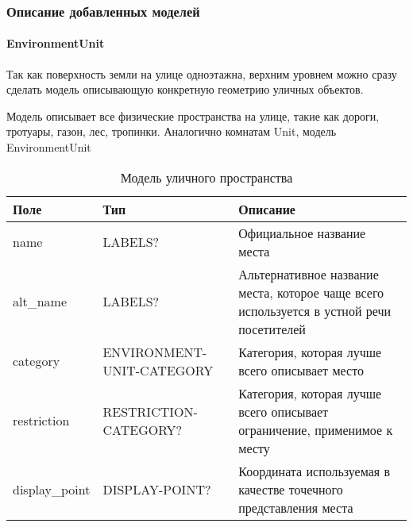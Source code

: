     \subsubsection{Описание добавленных моделей}
      \paragraph{EnvironmentUnit}
        Так как поверхность земли на улице одноэтажна, верхним уровнем можно сразу сделать модель описывающую конкретную геометрию уличных объектов.

        Модель описывает все физические пространства на улице, такие как дороги, тротуары, газон, лес, тропинки. Аналогично комнатам Unit, модель EnvironmentUnit
        \begin{center}
          \begin{xltabular}{\linewidth}{|l|p{4cm}|X|}
            \caption{Модель уличного пространства}\\\hline
            Поле           & Тип                       & Описание                                                                                 \\ \hline
            name           & LABELS?                   & Официальное название места                                                               \\ \hline
            alt\_name      & LABELS?                   & Альтернативное название места, которое чаще всего используется в устной речи посетителей \\ \hline
            category       & ENVIRONMENT-UNIT-CATEGORY & Категория, которая лучше всего описывает место                                           \\ \hline
            restriction    & RESTRICTION-CATEGORY?     & Категория, которая лучше всего описывает ограничение, применимое к месту                 \\ \hline
            display\_point & DISPLAY-POINT?            & Координата используемая в качестве точечного представления места                         \\ \hline
          \end{xltabular}
        \end{center}

